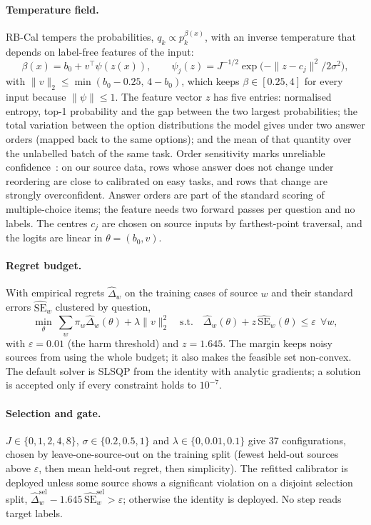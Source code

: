 \documentclass[runningheads]{llncs}
\begin{document}
\paragraph{Temperature field.}
RB-Cal tempers the probabilities, $q_k\propto p_k^{\beta(x)}$, with an inverse temperature that depends on label-free features of the input:
\begin{equation}
\beta(x)=b_0+v^\top\psi(z(x)),\qquad \psi_j(z)=J^{-1/2}\exp\!\big(-\|z-c_j\|^2/2\sigma^2\big),
\end{equation}
with $\|v\|_2\le\min(b_0-0.25,\,4-b_0)$, which keeps $\beta\in[0.25,4]$ for every input because $\|\psi\|\le1$.
The feature vector $z$ has five entries: normalised entropy, top-1 probability and the gap between the two largest probabilities; the total variation between the option distributions the model gives under two answer orders (mapped back to the same options); and the mean of that quantity over the unlabelled batch of the same task.
Order sensitivity marks unreliable confidence~\cite{pezeshkpour2024order,zheng2024pride}: on our source data, rows whose answer does not change under reordering are close to calibrated on easy tasks, and rows that change are strongly overconfident.
Answer orders are part of the standard scoring of multiple-choice items; the feature needs two forward passes per question and no labels.
The centres $c_j$ are chosen on source inputs by farthest-point traversal, and the logits are linear in $\theta=(b_0,v)$.

\paragraph{Regret budget.}
With empirical regrets $\hat\Delta_w$ on the training cases of source $w$ and their standard errors $\widehat{\mathrm{SE}}_w$ clustered by question,
\begin{equation}\label{eq:rbcal}
\min_\theta\ \sum_w\pi_w\hat\Delta_w(\theta)+\lambda\|v\|_2^2\quad\text{s.t.}\quad\hat\Delta_w(\theta)+z\,\widehat{\mathrm{SE}}_w(\theta)\le\varepsilon\ \ \forall w,
\end{equation}
with $\varepsilon=0.01$ (the harm threshold) and $z=1.645$.
The margin keeps noisy sources from using the whole budget; it also makes the feasible set non-convex.
The default solver is SLSQP from the identity with analytic gradients; a solution is accepted only if every constraint holds to $10^{-7}$.

\paragraph{Selection and gate.}
$J\in\{0,1,2,4,8\}$, $\sigma\in\{0.2,0.5,1\}$ and $\lambda\in\{0,0.01,0.1\}$ give 37 configurations, chosen by leave-one-source-out on the training split (fewest held-out sources above $\varepsilon$, then mean held-out regret, then simplicity).
The refitted calibrator is deployed unless some source shows a significant violation on a disjoint selection split, $\hat\Delta^{\mathrm{sel}}_w-1.645\,\widehat{\mathrm{SE}}^{\mathrm{sel}}_w>\varepsilon$; otherwise the identity is deployed.
No step reads target labels.
\end{document}
